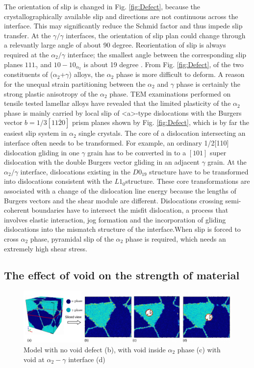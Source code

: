\documentclass[metals,article,submit,moreauthors,pdftex,10pt,a4paper]{Definitions/mdpi}
\begin{document}
The orientation of slip is changed in Fig. \ref{fig:Defect}, because the crystallographically available slip and directions are not continuous across the interface. This may significantly reduce the Schmid factor and thus impede slip transfer. At the $\gamma/\gamma$ interfaces, the orientation of slip plan could change through a relevantly large angle of about 90 degree. Reorientation of slip is always required at the $\alpha_{2}/\gamma$ interface; the smallest angle between the corresponding slip planes ${1 1 1}_{\gamma}$ and ${ 1 0 -1 0}_{\alpha_2}$ is about 19 degree \cite{intro-structure}. From Fig. \ref{fig:Defect}, of the two constituents of ($\alpha_2$+$\gamma$) alloys, the $\alpha_2$ phase is more difficult to deform. A reason for the unequal strain partitioning between the $\alpha_2$ and $\gamma$ phase is certainly the strong plastic anisotropy of the $\alpha_2$ phase. TEM examinations performed on tensile tested lamellar alloys have revealed that the limited plasticity of the $\alpha_2$ phase is mainly carried by local slip of <a>-type dislocations with the Burgers vector $b=1/3[11\overline{2}0]$ prism planes shown by Fig. \ref{fig:Defect}, which is by far the easiest slip system in $\alpha_2$ single crystals.  The core of a dislocation intersecting an interface often needs to be transformed. For example, an ordinary 1/2[110] dislocation gliding in one $\gamma$ grain has to be converted in to a $[101]$ super dislocation with the double Burgers vector gliding in an adjacent $\gamma$ grain. At the $\alpha_2/\gamma$ interface, dislocations existing in the $D0_{19}$ structure have to be transformed into dislocations consistent with the $L1_0$structure. These core transformations are associated with a change of the dislocation line energy because the lengths of Burgers vectors and the shear module are different. Dislocations crossing semi-coherent boundaries have to intersect the misfit dislocation, a process that involves elastic interaction, jog formation and the incorporation of gliding dislocations into the mismatch structure of the interface.When slip is forced to cross $\alpha_2$ phase, pyramidal slip of the $\alpha_2$ phase is required, which needs an extremely high shear stress.


\subsection{The effect of void on the strength of material}

\begin{figure}[ht]
	\centering
	\includegraphics[width=1\linewidth]{img/models}
	\caption{ Model with no void defect (b), with void inside $\alpha_2$ phase (c) with void at $\alpha_2-\gamma$ interface (d)}
	\label{fig:model-creation}
\end{figure}
\end{document}
